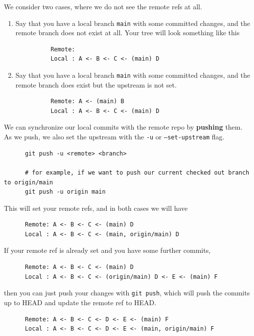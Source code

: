   \begin{definition}
    \label{def:push-with-set-upstream}
 
    We consider two cases, where we do not see the remote refs at all. 
    \begin{enumerate}
      \item Say that you have a local branch \texttt{main} with some committed changes, and the remote branch does not exist at all. Your tree will look something like this 
        \begin{lstlisting}
          Remote: 
          Local : A <- B <- C <- (main) D
        \end{lstlisting}
      \item Say that you have a local branch \texttt{main} with some committed changes, and the remote branch does exist but the upstream is not set. 
        \begin{lstlisting}
          Remote: A <- (main) B
          Local : A <- B <- C <- (main) D
        \end{lstlisting}
    \end{enumerate}
    We can synchronize our local commits with the remote repo by \textbf{pushing} them. As we push, we also set the upstream with the \texttt{-u} or \texttt{--set-upstream} flag. 
    \begin{lstlisting}
      git push -u <remote> <branch> 
      
      # for example, if we want to push our current checked out branch to origin/main
      git push -u origin main
    \end{lstlisting}
    This will set your remote refs, and in both cases we will have 
    \begin{lstlisting}
      Remote: A <- B <- C <- (main) D
      Local : A <- B <- C <- (main, origin/main) D
    \end{lstlisting}
  \end{definition}

  \begin{definition}[Push]
    \label{def:push}
 
    If your remote ref is already set and you have some further commits, 
    \begin{lstlisting}
      Remote: A <- B <- C <- (main) D
      Local : A <- B <- C <- (origin/main) D <- E <- (main) F
    \end{lstlisting}
    then you can just push your changes with \texttt{git push}, which will push the commits up to HEAD and update the remote ref to HEAD. 
    \begin{lstlisting}
      Remote: A <- B <- C <- D <- E <- (main) F
      Local : A <- B <- C <- D <- E <- (main, origin/main) F
    \end{lstlisting}
  \end{definition} 

